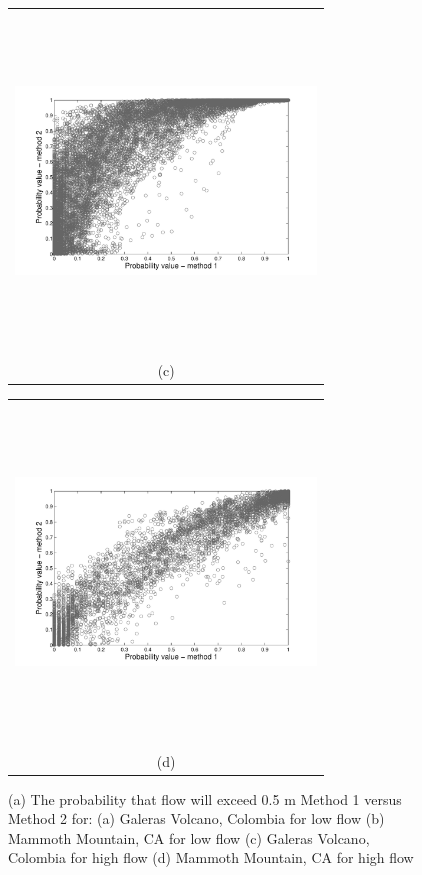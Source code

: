 \documentclass[12pt]{article}
\newcommand{\Pic}[2][0.85]{\begin{center}\texttt{[image: \#2]}
 \end{center} }
\begin{document}
\begin{figure}[H]
\begin{minipage}{0.6\textwidth}
    \end{minipage} 
        \begin{minipage}[b]{0.6\textwidth}
        \begin{tabular}{c}
       \includegraphics[width=8cm,height=9cm,keepaspectratio]{cloud_Galeras_high.pdf}\\
        (c)
        \end{tabular}
    \end{minipage}
    \begin{minipage}{0.6\textwidth}
        \begin{tabular}{c}
	\includegraphics[width=8cm,height=9cm,keepaspectratio]{cloud_Mammoth_high.pdf}\\
        (d)
        \end{tabular}
    \end{minipage}
    \caption{(a) The probability that flow will exceed 0.5 m Method 1
      versus Method 2 for: (a) Galeras Volcano, Colombia for low flow
      (b) Mammoth Mountain, CA for low flow (c) Galeras Volcano,
      Colombia for high flow (d) Mammoth Mountain, CA for high flow }
\label{fig6}  
\end{figure}
\end{document}

